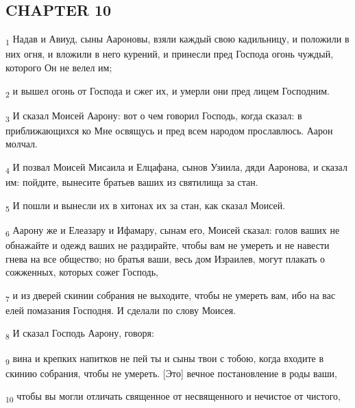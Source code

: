 \subsection{CHAPTER 10}
\begin{tcolorbox}
\textsubscript{1} Надав и Авиуд, сыны Аароновы, взяли каждый свою кадильницу, и положили в них огня, и вложили в него курений, и принесли пред Господа огонь чуждый, которого Он не велел им;
\end{tcolorbox}
\begin{tcolorbox}
\textsubscript{2} и вышел огонь от Господа и сжег их, и умерли они пред лицем Господним.
\end{tcolorbox}
\begin{tcolorbox}
\textsubscript{3} И сказал Моисей Аарону: вот о чем говорил Господь, когда сказал: в приближающихся ко Мне освящусь и пред всем народом прославлюсь. Аарон молчал.
\end{tcolorbox}
\begin{tcolorbox}
\textsubscript{4} И позвал Моисей Мисаила и Елцафана, сынов Узиила, дяди Ааронова, и сказал им: пойдите, вынесите братьев ваших из святилища за стан.
\end{tcolorbox}
\begin{tcolorbox}
\textsubscript{5} И пошли и вынесли их в хитонах их за стан, как сказал Моисей.
\end{tcolorbox}
\begin{tcolorbox}
\textsubscript{6} Аарону же и Елеазару и Ифамару, сынам его, Моисей сказал: голов ваших не обнажайте и одежд ваших не раздирайте, чтобы вам не умереть и не навести гнева на все общество; но братья ваши, весь дом Израилев, могут плакать о сожженных, которых сожег Господь,
\end{tcolorbox}
\begin{tcolorbox}
\textsubscript{7} и из дверей скинии собрания не выходите, чтобы не умереть вам, ибо на вас елей помазания Господня. И сделали по слову Моисея.
\end{tcolorbox}
\begin{tcolorbox}
\textsubscript{8} И сказал Господь Аарону, говоря:
\end{tcolorbox}
\begin{tcolorbox}
\textsubscript{9} вина и крепких напитков не пей ты и сыны твои с тобою, когда входите в скинию собрания, чтобы не умереть. [Это] вечное постановление в роды ваши,
\end{tcolorbox}
\begin{tcolorbox}
\textsubscript{10} чтобы вы могли отличать священное от несвященного и нечистое от чистого,
\end{tcolorbox}
